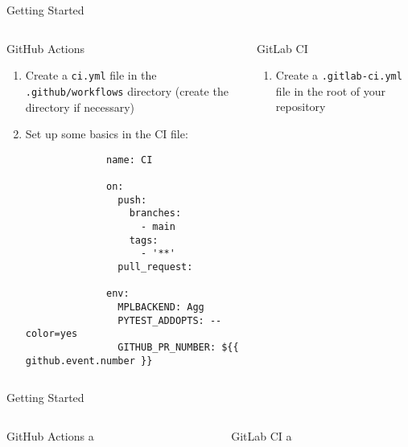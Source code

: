 \begin{frame}[fragile]{
    Getting Started
    \hfill
  }
  \begin{columns}[t, onlytextwidth]
    \begin{column}{0.48\textwidth}
      \begin{block}{GitHub Actions}
        \begin{enumerate}
          \item Create a \texttt{ci.yml} file in the \texttt{.github/workflows}
            directory (create the directory if necessary)
          \item Set up some basics in the CI file:
            \footnotesize
            \begin{verbatim}
              name: CI

              on:
                push:
                  branches:
                    - main
                  tags:
                    - '**'
                pull_request:

              env:
                MPLBACKEND: Agg
                PYTEST_ADDOPTS: --color=yes
                GITHUB_PR_NUMBER: ${{ github.event.number }}
            \end{verbatim}
        \end{enumerate}
      \end{block}
    \end{column}
    \begin{column}{0.48\textwidth}
      \begin{block}{GitLab CI}
        \begin{enumerate}
          \item Create a \texttt{.gitlab-ci.yml} file in the root of your repository
        \end{enumerate}
      \end{block}
    \end{column}
  \end{columns}
\end{frame}
\begin{frame}[fragile]{Getting Started}
  \begin{columns}[t, onlytextwidth]
    \begin{column}{0.48\textwidth}
      \begin{block}{GitHub Actions}
         a
      \end{block}
    \end{column}
    \begin{column}{0.48\textwidth}
      \begin{block}{GitLab CI}
         a
      \end{block}
    \end{column}
  \end{columns}
\end{frame}

